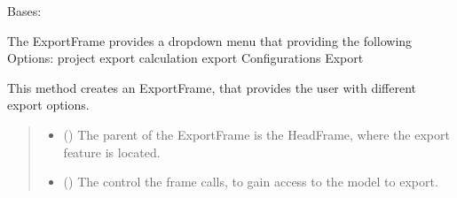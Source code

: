 \documentclass[letterpaper,10pt,english]{sphinxmanual}
\begin{document}
\begin{fulllineitems}
\label{\detokenize{apidoc/src.osm_configurator.view.utilityframes:src.osm_configurator.view.utilityframes.export_frame.ExportFrame}}
\pysigstartsignatures
{}
\pysigstopsignatures
\sphinxAtStartPar
Bases: 

\sphinxAtStartPar
The ExportFrame provides a dropdown menu that providing the following Options:
\sphinxhyphen{} project export
\sphinxhyphen{} calculation export
\sphinxhyphen{} Configurations Export

\begin{fulllineitems}
\label{\detokenize{apidoc/src.osm_configurator.view.utilityframes:src.osm_configurator.view.utilityframes.export_frame.ExportFrame.__init__}}
\pysigstartsignatures
{}
\pysigstopsignatures
\sphinxAtStartPar
This method creates an ExportFrame, that provides the user with different export options.
\begin{quote}\begin{description}
\begin{itemize}
\item {} 
\sphinxAtStartPar
{} ({\hyperref[\detokenize{apidoc/src.osm_configurator.view.toplevelframes:src.osm_configurator.view.toplevelframes.project_head_frame.ProjectHeadFrame}]{}}) \textendash{} The parent of the ExportFrame is the HeadFrame, where the export feature is located.

\item {} 
\sphinxAtStartPar
{} ({\hyperref[\detokenize{apidoc/src.osm_configurator.control:src.osm_configurator.control.control_interface.IControl}]{}}) \textendash{} The control the frame calls, to gain access to the model to export.

\end{itemize}

\end{description}\end{quote}

\end{fulllineitems}


\end{fulllineitems}
\end{document}
